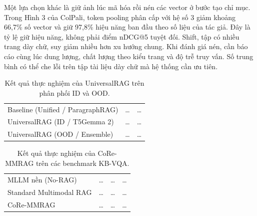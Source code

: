 Một lựa chọn khác là giữ ảnh lúc mã hóa rồi nén các
vector ở bước tạo chỉ mục. Trong Hình 3 của ColPali,
token pooling phân cấp với hệ số 3 giảm khoảng 66,7\%
số vector và giữ 97,8\% hiệu năng ban đầu theo số liệu
của tác giả. Đây là tỷ lệ giữ hiệu năng, không phải
điểm nDCG@5 tuyệt đối. Shift, tập có nhiều trang dày chữ,
suy giảm nhiều hơn xu hướng chung. Khi đánh giá nén,
cần báo cáo cùng lúc dung lượng, chất lượng theo kiểu
trang và độ trễ truy vấn. Số trung bình có thể che lỗi
trên tập tài liệu dày chữ mà hệ thống cần ưu tiên.


\begin{table}[H]
\centering
\small
\caption[Kết quả thực nghiệm của UniversalRAG trên phân phối ID và OOD]{Kết quả thực nghiệm của UniversalRAG trên phân phối ID và OOD.}
\label{tab:universalrag_results}
\renewcommand{\arraystretch}{1.24}
\begin{tabularx}{\textwidth}{@{}P{4.8cm}M{2.6cm}L@{}}
\toprule
{}
 &  &  \\
\midrule
Baseline (Unified / ParagraphRAG) & \dots & \dots \\
UniversalRAG (ID / T5Gemma 2) & \dots & \dots \\
UniversalRAG (OOD / Ensemble) & \dots & \dots \\
\bottomrule
\end{tabularx}
\end{table}


\begin{table}[H]
\centering
\small
\caption[Kết quả thực nghiệm của CoRe-MMRAG trên các benchmark KB-VQA]{Kết quả thực nghiệm của CoRe-MMRAG trên các benchmark KB-VQA.}
\label{tab:core_results}
\renewcommand{\arraystretch}{1.24}
\begin{tabularx}{\textwidth}{@{}P{4.2cm}M{2.2cm}M{2.6cm}L@{}}
\toprule
{}
 &  &  &  \\
\midrule
MLLM nền (No-RAG) & \dots & \dots & \dots \\
Standard Multimodal RAG & \dots & \dots & \dots \\
CoRe-MMRAG & \dots & \dots & \dots \\
\bottomrule
\end{tabularx}
\end{table}

